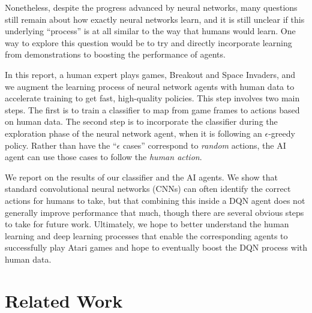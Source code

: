 \documentclass[letterpaper, 10pt, conference]{ieeeconf}
\begin{document}
Nonetheless, despite the progress advanced by neural networks, many questions
still remain about how exactly neural networks learn, and it is still unclear if
this underlying ``process'' is at all similar to the way that humans would
learn. One way to explore this question would be to try and directly incorporate
learning from demonstrations to boosting the performance of agents.

In this report, a human expert plays games, Breakout and Space Invaders, and we
augment the learning process of neural network agents with human data to
accelerate training to get fast, high-quality policies. This step involves two
main steps. The first is to train a classifier to map from game frames to
actions based on human data. The second step is to incorporate the classifier
during the exploration phase of the neural network agent, when it is following
an $\epsilon$-greedy policy. Rather than have the ``$\epsilon$ cases''
correspond to \emph{random} actions, the AI agent can use those cases to follow
the \emph{human action}.

We report on the results of our classifier and the AI agents. We show that
standard convolutional neural networks (CNNs) can often identify the correct
actions for humans to take, but that combining this inside a DQN agent does not
generally improve performance that much, though there are several obvious
steps to take for future work. Ultimately, we hope to better understand the
human learning and deep learning processes that enable the corresponding
agents to successfully play Atari games and hope to eventually boost the DQN
process with human data.


\section{Related Work}\label{sec:related_work}
\end{document}
